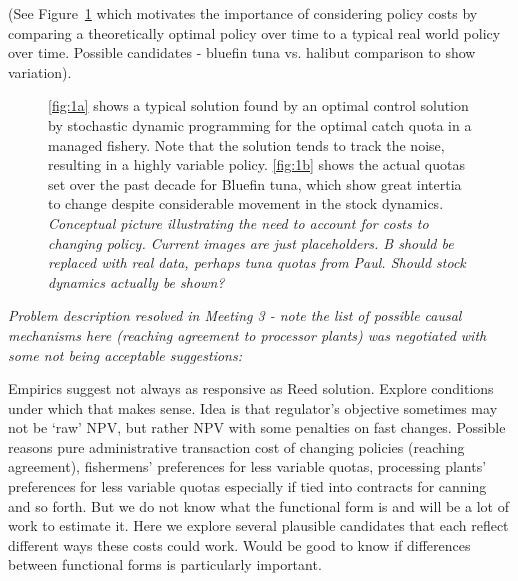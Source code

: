 \documentclass[authoryear, review, 12pt]{elsarticle}
\newcommand{\cdb}[1]{{\it \color{darkgreen} #1}}
\newcommand{\pa}[1]{{\it \color{darkblue} #1}}
\begin{document}
(See Figure~\ref{fig:1} which motivates the importance of considering policy costs by comparing a theoretically optimal policy over time to a typical real world policy over time. Possible candidates - bluefin tuna vs. halibut comparison to show variation).  

\begin{figure}[ht]
  \begin{center}
  \end{center}
  \caption{\ref{fig:1a} shows a typical solution found by an optimal
  control solution by stochastic dynamic programming for the optimal catch
  quota in a managed fishery.  Note that the solution tends to track the
  noise, resulting in a highly variable policy.  \ref{fig:1b} shows the
  actual quotas set over the past decade for Bluefin tuna, which show
  great intertia to change despite considerable movement in the stock
  dynamics.  \cdb{Conceptual picture illustrating the need to account
  for costs to changing policy. Current images are just placeholders.
  B should be replaced with real data, perhaps tuna quotas from Paul.
  Should stock dynamics actually be shown?}}
  \label{fig:1}
\end{figure}


\pa{
 Problem description resolved in Meeting 3 - note the list of possible causal mechanisms here (reaching agreement to processor plants) was negotiated with some not being acceptable suggestions: 

 Empirics suggest not always as responsive as Reed solution. Explore conditions under which that makes sense. Idea is that regulator’s objective sometimes may not be `raw' NPV, but rather NPV with some penalties on fast changes. Possible reasons pure administrative transaction cost of changing policies (reaching agreement), fishermens' preferences for less variable quotas, processing plants' preferences for less variable quotas especially if tied into contracts for canning and so forth. But we do not know what the functional form is and will be a lot of work to estimate it. Here we explore several plausible candidates that each reflect different ways these costs could work. Would be good to know if differences between functional forms is particularly important.
}
\end{document}
